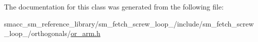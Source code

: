 The documentation for this class was generated from the following file\+:\begin{DoxyCompactItemize}
\item 
smacc\+\_\+sm\+\_\+reference\+\_\+library/sm\+\_\+fetch\+\_\+screw\+\_\+loop\+\_/include/sm\+\_\+fetch\+\_\+screw\+\_\+loop\+\_/orthogonals/\hyperlink{sm__fetch__screw__loop__1_2include_2sm__fetch__screw__loop__1_2orthogonals_2or__arm_8h}{or\+\_\+arm.\+h}\end{DoxyCompactItemize}
